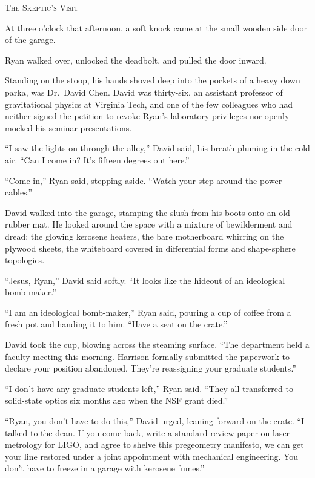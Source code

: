 \documentclass[12pt,twoside,openright]{book}
\newcommand{\sceneheader}[1]{%
  \par\vspace{1.8em}%
  {\noindent\centering\scshape\large #1\par}%
  \vspace{1.0em}%
  \noindent%
}
\newcommand{\dinkus}{%
  \par\vspace{1.2em}%
  {\noindent\centering{\large $\ast\quad\ast\quad\ast$}\par}%
  \vspace{1.2em}%
  \noindent%
}
\begin{document}
\dinkus

\sceneheader{The Skeptic's Visit}

At three o'clock that afternoon, a soft knock came at the small wooden
side door of the garage.

Ryan walked over, unlocked the deadbolt, and pulled the door inward.

Standing on the stoop, his hands shoved deep into the pockets of a heavy
down parka, was Dr.~David Chen. David was thirty-six, an assistant
professor of gravitational physics at Virginia Tech, and one of the few
colleagues who had neither signed the petition to revoke Ryan's
laboratory privileges nor openly mocked his seminar presentations.

``I saw the lights on through the alley,'' David said, his breath
pluming in the cold air. ``Can I come in? It's fifteen degrees out
here.''

``Come in,'' Ryan said, stepping aside. ``Watch your step around the
power cables.''

David walked into the garage, stamping the slush from his boots onto an
old rubber mat. He looked around the space with a mixture of
bewilderment and dread: the glowing kerosene heaters, the bare
motherboard whirring on the plywood sheets, the whiteboard covered in
differential forms and shape-sphere topologies.

``Jesus, Ryan,'' David said softly. ``It looks like the hideout of an
ideological bomb-maker.''

``I am an ideological bomb-maker,'' Ryan said, pouring a cup of coffee
from a fresh pot and handing it to him. ``Have a seat on the crate.''

David took the cup, blowing across the steaming surface. ``The
department held a faculty meeting this morning. Harrison formally
submitted the paperwork to declare your position abandoned. They're
reassigning your graduate students.''

``I don't have any graduate students left,'' Ryan said. ``They all
transferred to solid-state optics six months ago when the NSF grant
died.''

``Ryan, you don't have to do this,'' David urged, leaning forward on the
crate. ``I talked to the dean. If you come back, write a standard review
paper on laser metrology for LIGO, and agree to shelve this pregeometry
manifesto, we can get your line restored under a joint appointment with
mechanical engineering. You don't have to freeze in a garage with
kerosene fumes.''
\end{document}

